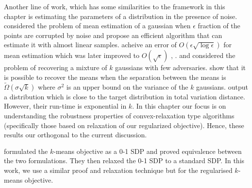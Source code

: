 \documentclass[12pt]{article}
\begin{document}
Another line of work, which has some similarities to the framework in this chapter is estimating the parameters of a distribution in the presence of noise. \cite{lai2016agnostic} considered the problem of mean estimation of a gaussian when $\epsilon$ fraction of the points are corrupted by noise and propose an efficient algorithm that can estimate it with almost linear samples. \cite{diakonikolas2016robust} acheive an error of $O(\epsilon\sqrt{\log \epsilon})$ for mean estimation which was later improved to $O(\sqrt\epsilon)$ \cite{diakonikolas2017being}, \cite{steinhardt2018resilience}. \cite{charikar2017learning} and \cite{diakonikolas2016robust} considered the problem of recovering a mixture of $k$ gaussians with few adversaries. \cite{charikar2017learning} show that it is possible to recover the means when the separation between the means is $\tilde \Omega(\sigma \sqrt{k})$ where $\sigma^2$ is an upper bound on the variance of the $k$ gaussians. \cite{diakonikolas2016robust} output a distribution which is close to the target distribution in total variation distance. However, their run-time is exponential in $k$. In this chapter our focus is on understanding the robustness properties of convex-relaxation type algorithms (specifically those based on relaxation of our regularized objective). Hence, these results our orthogonal to the current discussion.  


\cite{peng2007approximating} formulated the $k$-means objective as a 0-1 SDP and proved equivalence between the two formulations. They then relaxed the 0-1 SDP to a standard SDP. In this work, we use a similar proof and relaxation technique but for the regularised $k$-means objective. 
\end{document}
